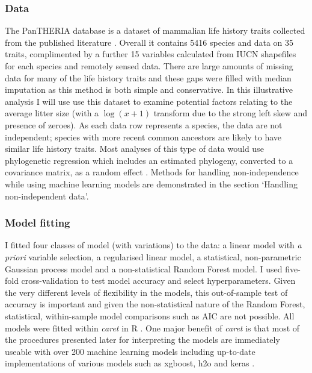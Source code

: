 \documentclass[10pt,]{article}
\begin{document}
\subsubsection{Data}\label{data}

The PanTHERIA database is a dataset of mammalian life history traits collected from the published literature \citep{jones2009pantheria}. Overall it contains 5416 species and data on 35 traits, complimented by a further 15 variables calculated from IUCN shapefiles for each species and remotely sensed data. There are large amounts of missing data for many of the life history traits and these gaps were filled with median imputation as this method is both simple and conservative. In this illustrative analysis I will use use this dataset to examine potential factors relating to the average litter size (with a \(\log(x+1)\) transform due to the strong left skew and presence of zeroes). As each data row represents a species, the data are not independent; species with more recent common ancestors are likely to have similar life history traits. Most analyses of this type of data \citep{gay2014parasite, pellissier2012shifts, ferguson2014colony} would use phylogenetic regression which includes an estimated phylogeny, converted to a covariance matrix, as a random effect \citep{magnusson2017glmmtmb, caper}. Methods for handling non-independence while using machine learning models are demonstrated in the section `Handling non-independent data'.

\subsubsection{Model fitting}\label{model-fitting}

I fitted four classes of model (with variations) to the data: a linear model with \emph{a priori} variable selection, a regularised linear model, a statistical, non-parametric Gaussian process model and a non-statistical Random Forest model. I used five-fold cross-validation to test model accuracy and select hyperparameters. Given the very different levels of flexibility in the models, this out-of-sample test of accuracy is important and given the non-statistical nature of the Random Forest, statistical, within-sample model comparisons such as AIC are not possible. All models were fitted within \emph{caret} \citep{caret} in R \citep{R}. One major benefit of \emph{caret} is that most of the procedures presented later for interpreting the models are immediately useable with over 200 machine learning models including up-to-date implementations of various models such as xgboost, h2o and keras \citep{xgboost, h2o, keras}.
\end{document}
